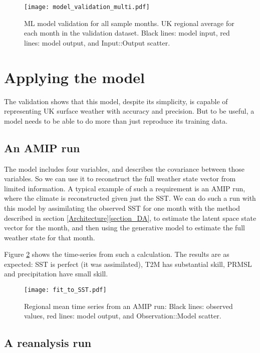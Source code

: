 \documentclass{ametsocV6.1}
\begin{document}
\begin{figure}[h]
\texttt{[image: model\_validation\_multi.pdf]}
\caption{ML model validation for all sample months. UK regional average for each month in the validation dataset. Black lines: model input, red lines: model output, and Input::Output scatter.}
\label{model_validation_multi}
\end{figure}


\section{Applying the model}

The validation shows that this model, despite its simplicity, is capable of representing UK surface weather with accuracy and precision. But to be useful, a model needs to be able to do more than just reproduce its training data.


\subsection{An AMIP run}

The model includes four variables, and describes the covariance between those variables. So we can use it to reconstruct the full weather state vector from limited information. A typical example of such a requirement is an AMIP run, where the climate is reconstructed given just the SST. We can do such a run with this model by assimilating the observed SST for one month with the method described in section \ref{Architecture}\ref{section_DA}, to estimate the latent space state vector for the month, and then using the generative model to estimate the full weather state for that month.

Figure \ref{fit_to_SST} shows the time-series from such a calculation. The results are as expected: SST is perfect (it was assimilated), T2M has substantial skill, PRMSL and precipitation have small skill.

\begin{figure}[h]
\texttt{[image: fit\_to\_SST.pdf]}
\caption{Regional mean time series from an AMIP run: Black lines: observed values, red lines: model output, and Observation::Model scatter.}
\label{fit_to_SST}
\end{figure}
    
\subsection{A reanalysis run}
\end{document}
